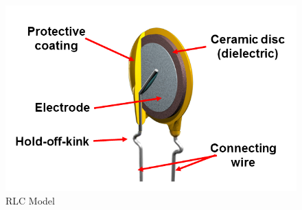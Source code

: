 \begin{figure}
\includegraphics[keepaspectratio=true,scale=.5]{./figures/modeling/rlcModel.png}
\centering
\caption{RLC Model}
\label{fig:rlcModel}
\end{figure}
